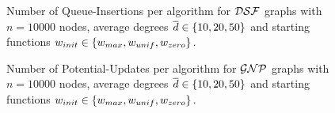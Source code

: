 \begin{figure}[!htb]
  \centering
  \caption{
      Number of Queue-Insertions per algorithm for $\mathcal{DSF}$ graphs with $n = 10000$ nodes, average degrees $\overline{d} \in \left\{10, 20, 50\right\}$ and starting functions $w_{init} \in \left\{w_{max}, w_{unif}, w_{zero}\right\}$.
  }
  \label{fig:app_ins_dsf}
\end{figure}

\begin{figure}
  \centering
  \caption{
      Number of Potential-Updates per algorithm for $\mathcal{GNP}$ graphs with $n = 10000$ nodes, average degrees $\overline{d} \in \left\{10, 20, 50\right\}$ and starting functions $w_{init} \in \left\{w_{max}, w_{unif}, w_{zero}\right\}$.
  }
  \label{fig:app_pot_gnp}
\end{figure}

